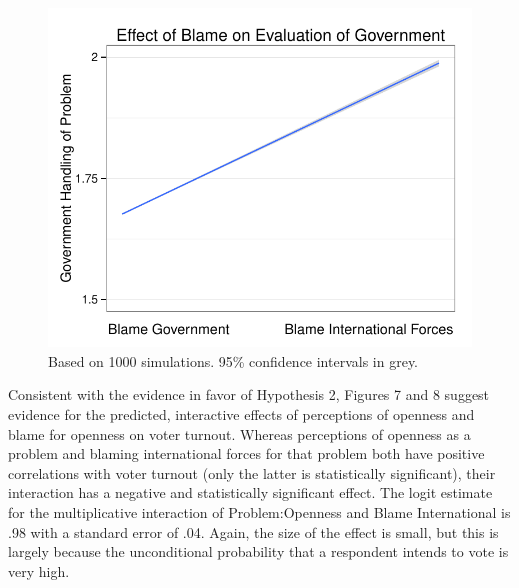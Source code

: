 \documentclass[12pt]{report}
\begin{document}
\begin{center}
\begin{figure}
\includegraphics{article1_govhandling_effect}
\caption{Based on 1000 simulations. 95\% confidence intervals in grey.}
\end{figure}
\end{center}

Consistent with the evidence in favor of Hypothesis 2, Figures 7 and 8 suggest evidence for the
predicted, interactive effects of perceptions of openness and blame for openness on voter turnout.
Whereas perceptions of openness as a problem and blaming international forces for that problem both
have positive correlations with voter turnout (only the latter is statistically significant), their
interaction has a negative and statistically significant effect. The logit estimate for the
multiplicative interaction of Problem:Openness and Blame International is .98 with a
standard error of .04. Again, the size of the effect is small, but this is largely because
the unconditional probability that a respondent intends to vote is very high.
\end{document}
